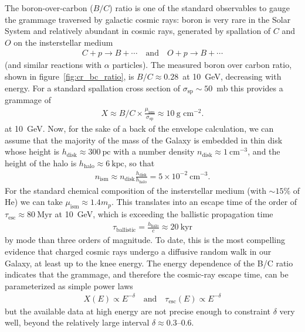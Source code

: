 The boron-over-carbon ($B/C$) ratio is one of the standard observables to gauge the
grammage traversed by galactic cosmic rays: boron is very rare in the Solar System
and relatively abundant in cosmic rays, generated by spallation of $C$ and $O$ on
the insterstellar medium
\begin{align*}
  C + p \rightarrow B + \cdots \quad\text{and}\quad
  O + p \rightarrow B + \cdots
\end{align*}
(and similar reactions with $\alpha$ particles). The measured boron over carbon ratio,
shown in figure~\ref{fig:cr_bc_ratio}, is $B/C \approx 0.28$~at 10~GeV, decreasing
with energy. For a standard spallation cross section of $\sigma_\text{sp} \sim 50$~mb
this provides a grammage of
\begin{align*}
  X \approx B/C \times \frac{\mu_\text{ism}}{\sigma_\text{sp}} \approx 10~\text{g~cm}^{-2}.
\end{align*}
at 10~GeV. Now, for the sake of a back of the envelope calculation, we can assume
that the majority of the mass of the Galaxy is embedded in thin disk whose height
is $h_\text{disk} \approx 300~\text{pc}$ with a number density
$n_\text{disk} \approx 1~\text{cm}^{-3}$, and the height of the halo is
$h_\text{halo} \approx 6~\text{kpc}$, so that
\begin{align*}
  n_\text{ism} \approx n_\text{disk} \frac{h_\text{disk}}{h_\text{halo}} =
  5 \times 10^{-2}~\text{cm}^{-3}.
\end{align*}
For the standard chemical composition of the insterstellar medium (with $\sim 15\%$
of He) we can take $\mu_\text{ism} \approx 1.4 m_p$. This translates into an escape time of the order of
$\tau_\text{esc} \approx 80~$Myr at 10~GeV, which is exceeding the ballistic
propagation time
\begin{align*}
  \tau_\text{ballistic} = \frac{h_\text{halo}}{c} \approx 20~\text{kyr}
\end{align*}
by mode than three orders of magnitude. To date, this is the most compelling evidence
that charged cosmic rays undergo a diffusive random walk in our Galaxy, at least
up to the knee energy. The energy dependence of the B/C ratio indicates that the
grammage, and therefore the cosmic-ray escape time, can be parameterized as simple
power laws
\begin{align}
  X(E) \propto E^{-\delta}
  \quad\text{and}\quad
  \tau_\text{esc}(E) \propto E^{-\delta}
\end{align}
but the available data at high energy are not precise enough to constraint $\delta$
very well, beyond the relatively large interval $\delta \approx 0.3$--$0.6$.

